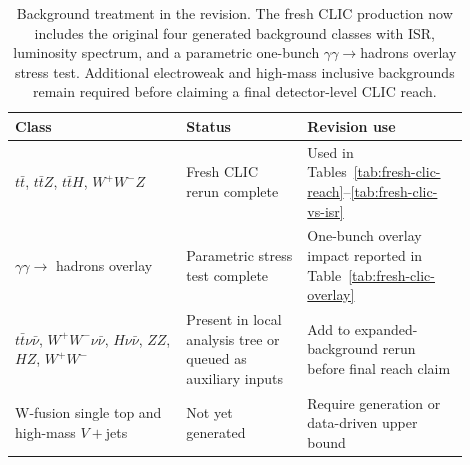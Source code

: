 \begin{table}[t]
\centering
\caption{Background treatment in the revision.  The fresh CLIC production now
includes the original four generated background classes with ISR, luminosity
spectrum, and a parametric one-bunch $\gamma\gamma\to$hadrons overlay stress
test.  Additional electroweak and high-mass inclusive backgrounds remain
required before claiming a final detector-level CLIC reach.}
\label{tab:background-status}
\small
\begin{tabular}{@{}p{0.34\linewidth}p{0.24\linewidth}p{0.32\linewidth}@{}}
\toprule
Class & Status & Revision use \\
\midrule
$t\bar t$, $t\bar t Z$, $t\bar t H$, $W^+W^-Z$ & Fresh CLIC rerun complete & Used in Tables~\ref{tab:fresh-clic-reach}--\ref{tab:fresh-clic-vs-isr} \\
$\gamma\gamma\to$ hadrons overlay & Parametric stress test complete & One-bunch overlay impact reported in Table~\ref{tab:fresh-clic-overlay} \\
$t\bar t\nu\bar\nu$, $W^+W^-\nu\bar\nu$, $H\nu\bar\nu$, $ZZ$, $HZ$, $W^+W^-$ & Present in local analysis tree or queued as auxiliary inputs & Add to expanded-background rerun before final reach claim \\
W-fusion single top and high-mass $V+$jets & Not yet generated & Require generation or data-driven upper bound \\
\bottomrule
\end{tabular}
\end{table}
